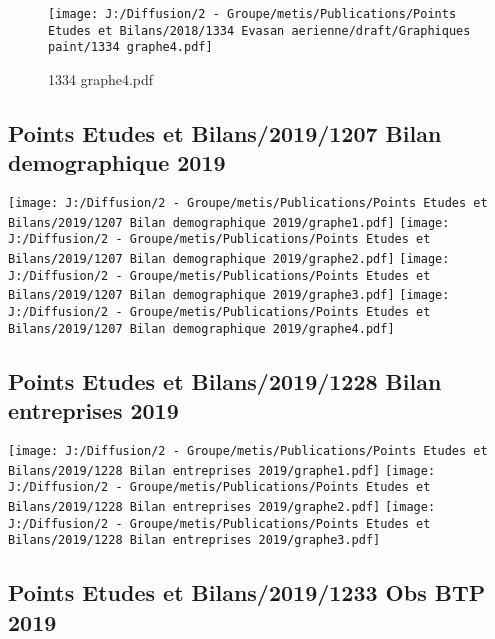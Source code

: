 \documentclass[
]{article}
\begin{document}
\begin{figure}
\centering
\texttt{[image: J:/Diffusion/2 - Groupe/metis/Publications/Points Etudes et Bilans/2018/1334 Evasan aerienne/draft/Graphiques paint/1334 graphe4.pdf]}
\caption{1334 graphe4.pdf}
\end{figure}

\hypertarget{points-etudes-et-bilans20191207-bilan-demographique-2019}{%
\subsection{Points Etudes et Bilans/2019/1207 Bilan demographique
2019}\label{points-etudes-et-bilans20191207-bilan-demographique-2019}}

\texttt{[image: J:/Diffusion/2 - Groupe/metis/Publications/Points Etudes et Bilans/2019/1207 Bilan demographique 2019/graphe1.pdf]}
\texttt{[image: J:/Diffusion/2 - Groupe/metis/Publications/Points Etudes et Bilans/2019/1207 Bilan demographique 2019/graphe2.pdf]}
\texttt{[image: J:/Diffusion/2 - Groupe/metis/Publications/Points Etudes et Bilans/2019/1207 Bilan demographique 2019/graphe3.pdf]}
\texttt{[image: J:/Diffusion/2 - Groupe/metis/Publications/Points Etudes et Bilans/2019/1207 Bilan demographique 2019/graphe4.pdf]}

\hypertarget{points-etudes-et-bilans20191228-bilan-entreprises-2019}{%
\subsection{Points Etudes et Bilans/2019/1228 Bilan entreprises
2019}\label{points-etudes-et-bilans20191228-bilan-entreprises-2019}}

\texttt{[image: J:/Diffusion/2 - Groupe/metis/Publications/Points Etudes et Bilans/2019/1228 Bilan entreprises 2019/graphe1.pdf]}
\texttt{[image: J:/Diffusion/2 - Groupe/metis/Publications/Points Etudes et Bilans/2019/1228 Bilan entreprises 2019/graphe2.pdf]}
\texttt{[image: J:/Diffusion/2 - Groupe/metis/Publications/Points Etudes et Bilans/2019/1228 Bilan entreprises 2019/graphe3.pdf]}

\hypertarget{points-etudes-et-bilans20191233-obs-btp-2019}{%
\subsection{Points Etudes et Bilans/2019/1233 Obs BTP
2019}\label{points-etudes-et-bilans20191233-obs-btp-2019}}
\end{document}
